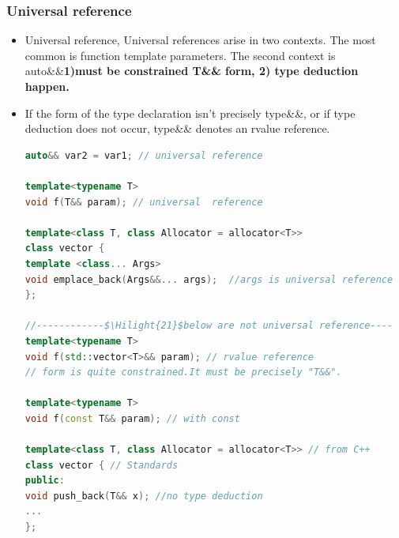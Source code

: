 \documentclass[a4paper,12pt,twoside]{book}
\newcommand{\Hilight}[1]{\makebox[0pt][l]{\color{yellow}\rule[-3pt]{#1em}{11pt}}}
\begin{document}
\subsubsection{Universal reference}
\begin{itemize}

\item Universal reference, Universal references arise in two contexts. The most common is function template parameters. The second context is auto\&\&\textbf{1)must be constrained T\&\& form, 2) type deduction happen.}

\item If the form of the type declaration isn't precisely type\&\&, or if type deduction
does not occur, type\&\& denotes an rvalue reference.
\begin{lstlisting}[frame=single, language=c++, mathescape=true]
auto&& var2 = var1; // universal reference

template<typename T>
void f(T&& param); // universal  reference

template<class T, class Allocator = allocator<T>>
class vector {
template <class... Args>
void emplace_back(Args&&... args);  //args is universal reference
};

//------------$\Hilight{21}$below are not universal reference----
template<typename T>
void f(std::vector<T>&& param); // rvalue reference
// form is quite constrained.It must be precisely "T&&".

template<typename T>
void f(const T&& param); // with const

template<class T, class Allocator = allocator<T>> // from C++
class vector { // Standards
public:
void push_back(T&& x); //no type deduction
...
};
\end{lstlisting}

\end{itemize}
\end{document}
